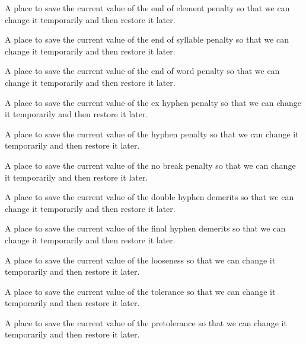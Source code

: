 A place to save the current value of the end of element penalty so that we can change it temporarily and then restore it later.

A place to save the current value of the end of syllable penalty so that we can change it temporarily and then restore it later.

A place to save the current value of the end of word penalty so that we can change it temporarily and then restore it later.

A place to save the current value of the ex hyphen penalty so that we can change it temporarily and then restore it later.

A place to save the current value of the hyphen penalty so that we can change it temporarily and then restore it later.

A place to save the current value of the no break penalty so that we can change it temporarily and then restore it later.

A place to save the current value of the double hyphen demerits so that we can change it temporarily and then restore it later.

A place to save the current value of the final hyphen demerits so that we can change it temporarily and then restore it later.

A place to save the current value of the looseness so that we can change it temporarily and then restore it later.

A place to save the current value of the tolerance so that we can change it temporarily and then restore it later.

A place to save the current value of the pretolerance so that we can change it temporarily and then restore it later.



